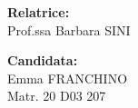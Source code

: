 \begin{titlepage}
\begin{minipage}[t]{0.47\textwidth}
  {\large{\bf{Relatrice:}} \\ Prof.ssa Barbara SINI}
  \vspace{0.5cm}
\end{minipage}\hfill\begin{minipage}[t]{0.47\textwidth}\raggedleft
  {\large{\bf Candidata:} \\Emma FRANCHINO\\}
    {\large{Matr. 20 D03 207}}
\end{minipage}

\vspace{25mm}
\hrulefill
\\
\end{titlepage}